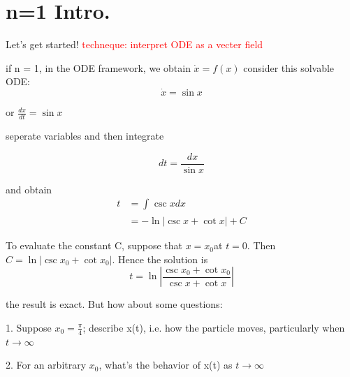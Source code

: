 \documentclass[9pt,aspectratio=43,mathserif,table]{beamer}
\begin{document}
\section{n=1 Intro.}
\begin{frame}{Let's get started!}
  \textcolor{red}{techneque: interpret ODE as a vecter field}
  \begin{multicols}{2}
  if n = 1, in the ODE framework, we obtain
  $\dot x = f(x)$
      consider this solvable ODE: 
      $$\dot x = \sin x$$

      or $\frac{ dx}{dt} = \sin x$

      seperate variables and then integrate

      $$dt = \frac{ dx}{\sin x}$$

      and obtain
          \begin{equation}
            \begin{aligned}
             t &= \int_{ }^{} \csc x dx \\
               &= - \ln |\csc x + \cot x| + C
            \end{aligned}
          \end{equation}

      To evaluate the constant C, suppose that  $x = x_0$at $t = 0$. Then $C = \ln | \csc x_0 + \cot x_0 |$. Hence the solution is
      $$t = \ln |\frac{ \csc x_0 + \cot x_0}{\csc x + \cot x}|$$

      the result is exact. But how about some questions:

      1. Suppose $x_0 = \frac{ \pi }{4}$; describe x(t), i.e. how the particle moves, particularly when $t \rightarrow \infty$

      2. For an arbitrary $x_0$, what's the behavior of x(t) as $t\rightarrow \infty$

  \end{multicols}
\end{frame}
\end{document}
